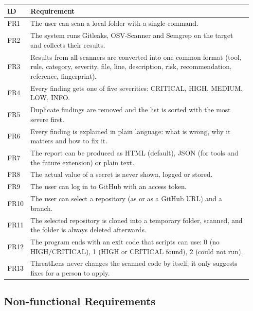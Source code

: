 \documentclass[12pt,a4paper]{article}
\newcommand{\code}[1]{\texttt{\detokenize{#1}}}
\begin{document}
\begin{longtable}{@{}p{1.2cm}p{13.8cm}@{}}
\toprule
\textbf{ID} & \textbf{Requirement} \\
\midrule
\endhead
FR1 & The user can scan a local folder with a single command. \\
FR2 & The system runs Gitleaks, OSV-Scanner and Semgrep on the target and collects their results. \\
FR3 & Results from all scanners are converted into one common \code{Finding} format (tool, rule, category, severity, file, line, description, risk, recommendation, reference, fingerprint). \\
FR4 & Every finding gets one of five severities: CRITICAL, HIGH, MEDIUM, LOW, INFO. \\
FR5 & Duplicate findings are removed and the list is sorted with the most severe first. \\
FR6 & Every finding is explained in plain language: what is wrong, why it matters and how to fix it. \\
FR7 & The report can be produced as HTML (default), JSON (for tools and the future extension) or plain text. \\
FR8 & The actual value of a secret is never shown, logged or stored. \\
FR9 & The user can log in to GitHub with an access token. \\
FR10 & The user can select a repository (as \code{owner/repo} or as a GitHub URL) and a branch. \\
FR11 & The selected repository is cloned into a temporary folder, scanned, and the folder is always deleted afterwards. \\
FR12 & The program ends with an exit code that scripts can use: 0 (no HIGH/CRITICAL), 1 (HIGH or CRITICAL found), 2 (could not run). \\
FR13 & ThreatLens never changes the scanned code by itself; it only suggests fixes for a person to apply. \\
\bottomrule
\end{longtable}

\subsection{Non-functional Requirements}
\end{document}

